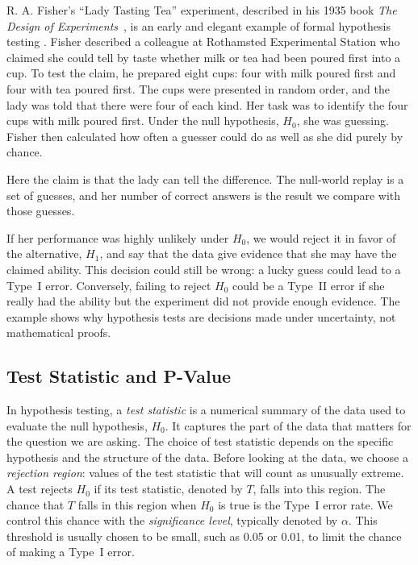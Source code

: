\begin{example}
R. A. Fisher's ``Lady Tasting Tea'' experiment, described in his 1935
book \emph{The Design of Experiments}~\citep{fisher1935design}, is an
early and elegant example of formal hypothesis testing
\citep{salsburg2002lady}. Fisher described a colleague at Rothamsted
Experimental Station who claimed she could tell by taste whether milk
or tea had been poured first into a cup. To test the claim, he prepared
eight cups: four with milk poured first and four with tea poured first.
The cups were presented in random order, and the lady was told that
there were four of each kind. Her task was to identify the four cups
with milk poured first. Under the null hypothesis, $H_0$, she was
guessing. Fisher then calculated how often a guesser could do as well
as she did purely by chance.

Here the claim is that the lady can tell the difference. The null-world
replay is a set of guesses, and her number of correct answers is the
result we compare with those guesses.

If her performance was highly unlikely under $H_0$, we would reject it
in favor of the alternative, $H_1$, and say that the data give evidence
that she may have the claimed ability. This decision could still be
wrong: a lucky guess could lead to a Type~I error. Conversely, failing
to reject $H_0$ could be a Type~II error if she really had the ability
but the experiment did not provide enough evidence. The example shows
why hypothesis tests are decisions made under uncertainty, not
mathematical proofs.
\end{example}


\subsection{Test Statistic and P-Value}

In hypothesis testing, a \emph{test statistic}
is a numerical summary of the data used to evaluate the null hypothesis,
$H_0$. It captures the part of the data that matters for the question
we are asking. The choice of test statistic depends on the specific
hypothesis and the structure of the data. Before looking at the data,
we choose a \emph{rejection region}:
values of the test statistic that will count as unusually extreme. A
test rejects $H_0$ if its test statistic, denoted by $T$, falls into
this region. The chance that $T$ falls in this region when $H_0$ is
true is the Type~I error rate. We control this chance with the
\emph{significance level},
typically denoted by $\alpha$. This threshold is usually chosen to be
small, such as 0.05 or 0.01, to limit the chance of making a
Type~I error.


